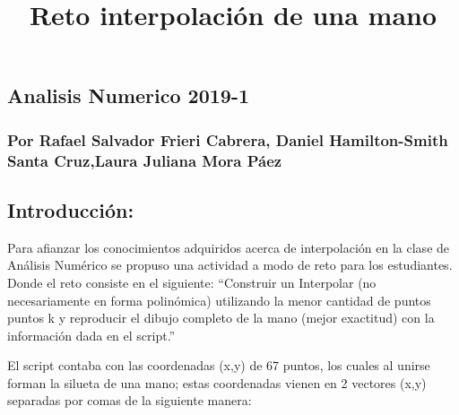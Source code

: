 \documentclass[]{article}
\title{Reto interpolación de una mano}
\author{}
\date{}
\begin{document}
\maketitle

\subsection{Analisis Numerico 2019-1}\label{analisis-numerico-2019-1}

\subsubsection{Por Rafael Salvador Frieri Cabrera, Daniel Hamilton-Smith
Santa Cruz,Laura Juliana Mora
Páez}\label{por-rafael-salvador-frieri-cabrera-daniel-hamilton-smith-santa-cruzlaura-juliana-mora-paez}

\subsection{Introducción:}\label{introduccion}

Para afianzar los conocimientos adquiridos acerca de interpolación en la
clase de Análisis Numérico se propuso una actividad a modo de reto para
los estudiantes. Donde el reto consiste en el siguiente: ``Construir un
Interpolar (no necesariamente en forma polinómica) utilizando la menor
cantidad de puntos puntos k y reproducir el dibujo completo de la mano
(mejor exactitud) con la información dada en el script.''

El script contaba con las coordenadas (x,y) de 67 puntos, los cuales al
unirse forman la silueta de una mano; estas coordenadas vienen en 2
vectores (x,y) separadas por comas de la siguiente manera:
\end{document}
